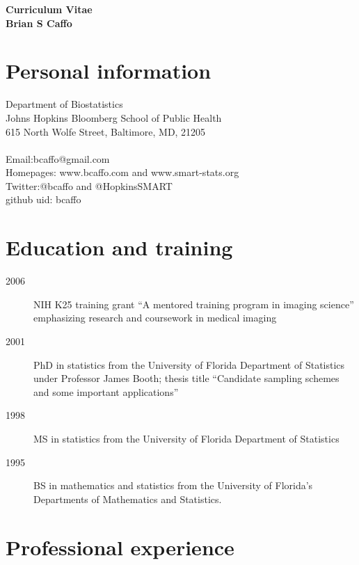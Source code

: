\documentclass[12pt]{article}
\begin{document}
{ \vspace{-.5in}
\begin{center}
\large
\bf Curriculum Vitae \\
Brian S Caffo \\
\end{center}
}

\section*{Personal information}
Department of Biostatistics\\
Johns Hopkins Bloomberg School of Public Health \\ 
615 North Wolfe Street, Baltimore, MD, 21205 \\ \\
Email:bcaffo@gmail.com \\
Homepages: www.bcaffo.com and www.smart-stats.org \\
Twitter:@bcaffo and @HopkinsSMART \\
github uid: bcaffo\\


\section*{Education and training}
\begin{description}
\item[\textnormal{2006}] NIH K25 training grant ``A mentored training program in imaging science'' emphasizing research and coursework in medical imaging
\item[\textnormal{2001}] PhD in statistics from the University of Florida Department of Statistics under Professor James Booth; thesis title ``Candidate sampling schemes and some important applications''
\item[\textnormal{1998}] MS in statistics from the University of Florida Department of Statistics
\item[\textnormal{1995}] BS in mathematics and statistics from the University of Florida's Departments of Mathematics and Statistics.
\end{description}


\section*{Professional experience}
\end{document}
